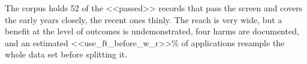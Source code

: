 The corpus holds 52 of the <<passed>> records that pass the screen and covers the early years closely, the recent ones thinly. The reach is very wide, but a benefit at the level of outcomes is undemonstrated, four harms are documented, and an estimated <<use_ft_before_w_r>>\% of applications resample the whole data set before splitting it.
